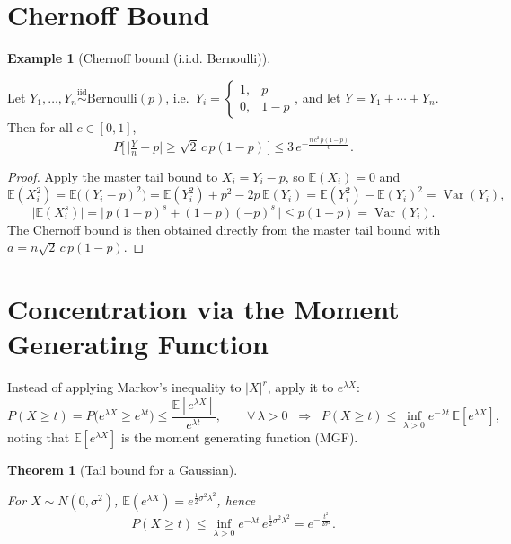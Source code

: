 \documentclass[
  letterpaper,
  DIV=11,
  numbers=noendperiod]{scrreprt}
\theoremstyle{definition}
\theoremstyle{plain}
\newtheorem{theorem}{Theorem}[chapter]
\theoremstyle{plain}
\theoremstyle{definition}
\newtheorem{example}{Example}[chapter]
\theoremstyle{plain}
\theoremstyle{plain}
\theoremstyle{remark}
\begin{document}
\section{Chernoff Bound}\label{chernoff-bound}

\begin{example}[Chernoff bound (i.i.d.
Bernoulli)]\protect\hypertarget{exm-chernoff}{}\label{exm-chernoff}

Let
\(Y_1, \dots, Y_n \overset{\text{iid}}{\sim} \mathrm{Bernoulli}(p)\),
i.e.~\(Y_i = \begin{cases} 1, & p \\ 0, & 1-p \end{cases}\), and let
\(Y = Y_1 + \cdots + Y_n\). Then for all \(c \in [0,1]\), \[
P\Big[\,\big|\tfrac{Y}{n} - p\big| \ge \sqrt{2}\, c\, p(1-p)\,\Big] \le 3\, e^{-\frac{n\, c^2\, p(1-p)}{6}}.
\]

\end{example}

\begin{proof}
Apply the master tail bound to \(X_i = Y_i - p\), so
\(\mathbb{E}(X_i) = 0\) and \[
\mathbb{E}(X_i^2) = \mathbb{E}\big((Y_i - p)^2\big) = \mathbb{E}(Y_i^2) + p^2 - 2p\,\mathbb{E}(Y_i) = \mathbb{E}(Y_i^2) - \mathbb{E}(Y_i)^2 = \operatorname{Var}(Y_i),
\] \[
\big|\mathbb{E}(X_i^s)\big| = \big|\, p(1-p)^s + (1-p)(-p)^s \,\big| \le p(1-p) = \operatorname{Var}(Y_i).
\] The Chernoff bound is then obtained directly from the master tail
bound with \(a = n\sqrt{2}\, c\, p(1-p)\).
\end{proof}

\section{Concentration via the Moment Generating
Function}\label{concentration-via-the-moment-generating-function}

Instead of applying Markov's inequality to \(|X|^r\), apply it to
\(e^{\lambda X}\): \[
P(X \ge t) = P\big(e^{\lambda X} \ge e^{\lambda t}\big) \le \frac{\mathbb{E}[e^{\lambda X}]}{e^{\lambda t}}, \qquad \forall\, \lambda > 0
\;\;\Longrightarrow\;\;
P(X \ge t) \le \inf_{\lambda > 0} e^{-\lambda t}\, \mathbb{E}[e^{\lambda X}],
\] noting that \(\mathbb{E}[e^{\lambda X}]\) is the moment generating
function (MGF).

\begin{theorem}[Tail bound for a
Gaussian]\protect\hypertarget{thm-gaussian-tail}{}\label{thm-gaussian-tail}

For \(X \sim N(0, \sigma^2)\),
\(\mathbb{E}(e^{\lambda X}) = e^{\frac{1}{2}\sigma^2 \lambda^2}\), hence
\[
P(X \ge t) \le \inf_{\lambda > 0} e^{-\lambda t}\, e^{\frac{1}{2}\sigma^2 \lambda^2} = e^{-\frac{t^2}{2\sigma^2}}.
\]

\end{theorem}
\end{document}
